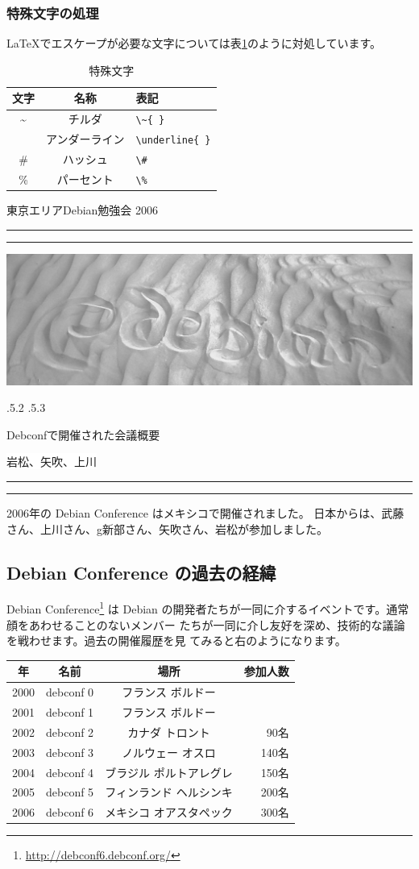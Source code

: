 \documentclass[mingoth,a4paper]{jsarticle}
\makeatletter
\renewcommand{\section}{\@startsection{section}{1}{\z@}%
    {\Cvs \@plus.5\Cdp \@minus.2\Cdp}%
    {.5\Cvs \@plus.3\Cdp}%
    {\normalfont\Huge\headfont\raggedright\centering}} %
\newcommand{\dancersection}[2]{%
\newpage
東京エリアDebian勉強会 2006
\hrule
\vspace{0.5mm}
\hrule
\hfill{}\includegraphics[width=16cm]{image2006-natsu/guruguru-sand-light.png}\\
\vspace{-5cm}
\begin{center}
\section{#1}
\end{center}
\hfill{}\colorbox{white}{#2}\hspace{3cm}\space\\
\vspace{1cm}
\hrule
\vspace{0.5mm}
\hrule
\vspace{1cm}
}
\newcommand{\tbref}[1]{表\ref{#1}}
\makeatother
\begin{document}
\subsubsection{特殊文字の処理}

\LaTeX でエスケープが必要な文字については\tbref{tab:tokushu}のように対処しています。
\begin{table}[ht]
 \caption{特殊文字}\label{tab:tokushu}
 \begin{center}
  \begin{tabular}{|c|c|l|}
  文字 & 名称 & 表記 \\
 \hline
 \~{ } & チルダ & \verb!\~{ }! \\
 \underline{ } & アンダーライン & \verb!\underline{ }!\\
 \# &ハッシュ& \verb!\#!\\
 \% &パーセント& \verb!\%!\\
  \end{tabular}
 \end{center}
\end{table}


\dancersection{Debconfで開催された会議概要}{岩松、矢吹、上川}
\label{sec:debconf6}

2006年の Debian Conference はメキシコで開催されました。
日本からは、武藤さん、上川さん、g新部さん、矢吹さん、岩松が参加しました。
\subsection{Debian Conference の過去の経緯}

\begin{minipage}{0.5\hsize}
Debian Conference\footnote{\url{http://debconf6.debconf.org/}} は Debian 
の開発者たちが一同に介するイベントです。通常顔をあわせることのないメンバー
たちが一同に介し友好を深め、技術的な議論を戦わせます。過去の開催履歴を見
てみると右のようになります。
\end{minipage}
\begin{minipage}{0.5\hsize}
\begin{center}
{\footnotesize
 \begin{tabular}{|c|c|c|r|}
 \hline
 年 & 名前 & 場所 & 参加人数 \\
 \hline
 2000 & debconf 0 &フランス ボルドー & \\
 2001 & debconf 1 &フランス ボルドー & \\
 2002 & debconf 2 &カナダ トロント & 90名 \\
 2003 & debconf 3 &ノルウェー オスロ & 140名 \\
 2004 & debconf 4 &ブラジル ポルトアレグレ &  150名 \\
 2005 & debconf 5 &フィンランド ヘルシンキ & 200名 \\
 2006 & debconf 6 &メキシコ オアスタペック & 300名 \\
 \hline
 \end{tabular}
}
\end{center}
\end{minipage}
\end{document}
